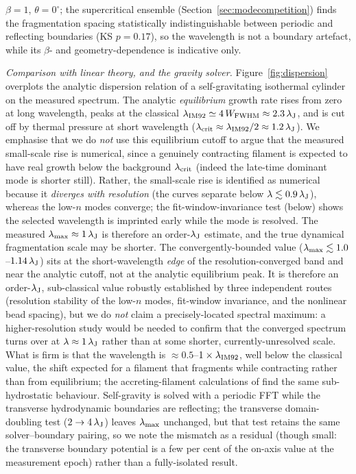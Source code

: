 \documentclass[usenatbib,twoside,twocolumn]{mnras}
\begin{document}
$\beta=1$, $\theta=0^\circ$; the supercritical ensemble (Section~\ref{sec:modecompetition}) finds the fragmentation spacing statistically indistinguishable between periodic and reflecting boundaries (KS $p=0.17$), so the wavelength is not a boundary artefact, while its $\beta$- and geometry-dependence is indicative only.

\emph{Comparison with linear theory, and the gravity solver.} Figure~\ref{fig:dispersion} overplots the analytic dispersion relation of a self-gravitating isothermal cylinder \citep{Nagasawa1987,Inutsuka1992,Fischera2012} on the measured spectrum. The analytic \emph{equilibrium} growth rate rises from zero at long wavelength, peaks at the classical $\lambda_{\rm IM92}\simeq4\,W_{\rm FWHM}\approx2.3\,\lambda_{\rm J}$, and is cut off by thermal pressure at short wavelength ($\lambda_{\rm crit}\approx\lambda_{\rm IM92}/2\approx1.2\,\lambda_{\rm J}$). We emphasise that we do \emph{not} use this equilibrium cutoff to argue that the measured small-scale rise is numerical, since a genuinely contracting filament is expected to have real growth below the background $\lambda_{\rm crit}$ (indeed the late-time dominant mode is shorter still). Rather, the small-scale rise is identified as numerical because it \emph{diverges with resolution} (the curves separate below $\lambda\lesssim0.9\,\lambda_{\rm J}$), whereas the low-$n$ modes converge; the fit-window-invariance test (below) shows the selected wavelength is imprinted early while the mode is resolved. The measured $\lambda_{\rm max}\approx1\,\lambda_{\rm J}$ is therefore an order-$\lambda_{\rm J}$ estimate, and the true dynamical fragmentation scale may be shorter. The convergently-bounded value ($\lambda_{\rm max}\lesssim1.0$--$1.14\,\lambda_{\rm J}$) sits at the short-wavelength \emph{edge} of the resolution-converged band and near the analytic cutoff, not at the analytic equilibrium peak. It is therefore an order-$\lambda_{\rm J}$, sub-classical value robustly established by three independent routes (resolution stability of the low-$n$ modes, fit-window invariance, and the nonlinear bead spacing), but we do \emph{not} claim a precisely-located spectral maximum: a higher-resolution study would be needed to confirm that the converged spectrum turns over at $\lambda\approx1\,\lambda_{\rm J}$ rather than at some shorter, currently-unresolved scale. What is firm is that the wavelength is $\approx0.5$--$1\times\lambda_{\rm IM92}$, well below the classical value, the shift expected for a filament that fragments while contracting rather than from equilibrium; the accreting-filament calculations of \citet{Clarke2016,Clarke2017} find the same sub-hydrostatic behaviour. Self-gravity is solved with a periodic FFT while the transverse hydrodynamic boundaries are reflecting; the transverse domain-doubling test ($2\to4\,\lambda_{\rm J}$) leaves $\lambda_{\rm max}$ unchanged, but that test retains the same solver--boundary pairing, so we note the mismatch as a residual (though small: the transverse boundary potential is a few per cent of the on-axis value at the measurement epoch) rather than a fully-isolated result.
\end{document}
